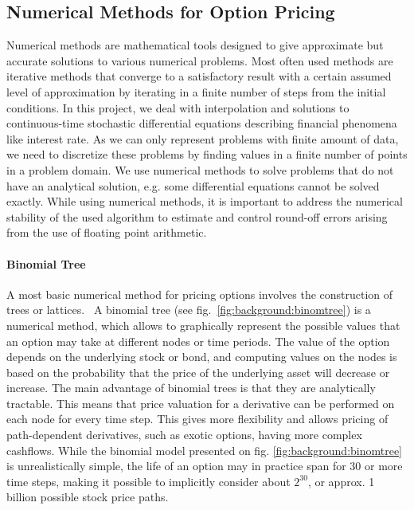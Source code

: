 \subsection{Numerical Methods for Option Pricing}

Numerical methods are mathematical tools designed to give approximate but accurate solutions to various numerical problems. Most often used methods are iterative methods that converge to a satisfactory result with a certain assumed level of approximation by iterating in a finite number of steps from the initial conditions. In this project, we deal with interpolation and solutions to continuous-time stochastic differential equations describing financial phenomena like interest rate. As we can only represent problems with finite amount of data, we need to discretize these problems by finding values in a finite number of points in a problem domain. We use numerical methods to solve problems that do not have an analytical solution, e.g. some differential equations cannot be solved exactly. While using numerical methods, it is important to address the numerical stability of the used algorithm to estimate and control round-off errors arising from the use of floating point arithmetic.

\paragraph{Binomial Tree}
 A most basic numerical method for pricing options involves the construction of trees or lattices.~\cite[pg. 253]{ofod} A binomial tree (see fig.~\ref{fig:background:binomtree}) is a numerical method, which allows to graphically represent the possible values that an option may take at different nodes or time periods. The value of the option depends on the underlying stock or bond, and computing values on the nodes is based on the probability that the price of the underlying asset will decrease or increase. The main advantage of binomial trees is that they are analytically tractable. This means that price valuation for a derivative can be performed on each node for every time step. This gives more flexibility and allows pricing of path-dependent derivatives, such as exotic options, having more complex cashflows. While the binomial model presented on fig. \ref{fig:background:binomtree} is unrealistically simple, the life of an option may in practice span for 30 or more time steps, making it possible to implicitly consider about $2^{30}$, or approx. 1 billion possible stock price paths.~\cite[pg. 268]{ofod}

